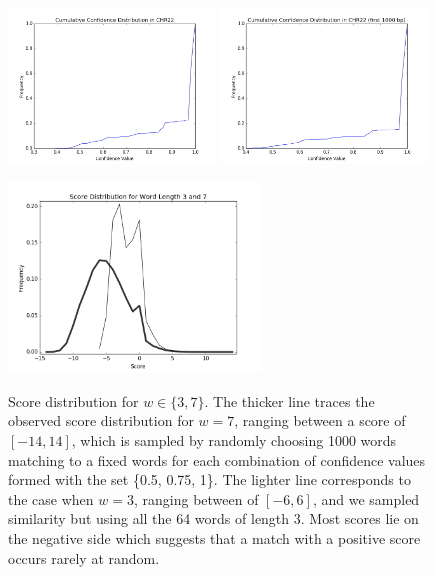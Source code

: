 \documentclass{article}
\begin{document}
\begin{figure}[tbp]
\begin{center}
\caption{}
   \includegraphics[width=0.49\textwidth]{conf-cum}
   \includegraphics[width=0.49\textwidth]{conf-cum-1000}
\label{figure:conf_cum}
\end{center}
\end{figure}
\begin{figure}[tbp]
\begin{center}

\caption{Score distribution for $w \in \{3, 7\}$. The thicker line traces the observed score distribution for $w=7$, ranging between a score of $[-14, 14]$, which is sampled by randomly choosing 1000 words matching to a fixed words for each combination of confidence values formed with the set \{0.5, 0.75, 1\}. The lighter line corresponds to the case when $w=3$, ranging between of $[-6, 6]$, and we sampled similarity but using all the 64 words of length 3. Most scores lie on the negative side which suggests that a match with a positive score occurs rarely at random.}
   \includegraphics[width=0.60\textwidth]{score-dist}
\label{figure:score_dist}
\end{center}
\end{figure}
\end{document}
